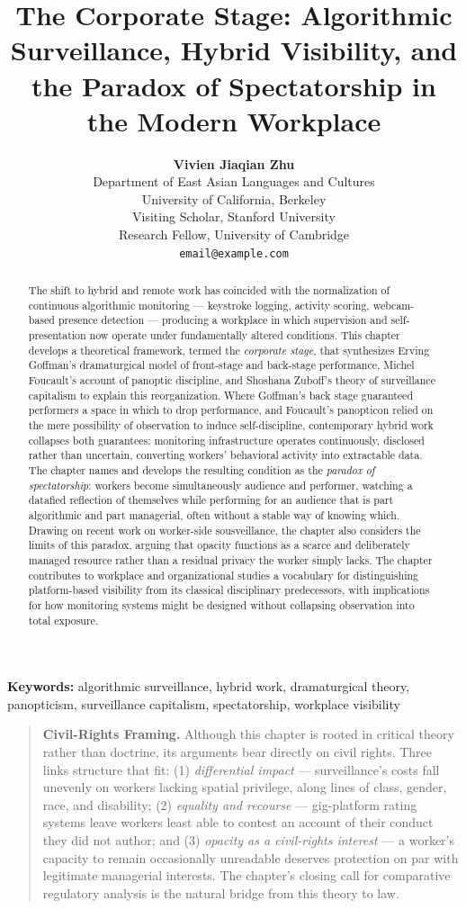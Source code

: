 \documentclass[12pt, a4paper]{article}
\title{\Large \textbf{The Corporate Stage: Algorithmic Surveillance, Hybrid Visibility, and the Paradox of Spectatorship in the Modern Workplace}}
\author{\textbf{Vivien Jiaqian Zhu} \\
Department of East Asian Languages and Cultures \\
University of California, Berkeley \\
Visiting Scholar, Stanford University \\
Research Fellow, University of Cambridge \\
\texttt{email@example.com}}
\date{}
\begin{document}
\maketitle

\begin{abstract}
\noindent The shift to hybrid and remote work has coincided with the normalization of continuous algorithmic monitoring --- keystroke logging, activity scoring, webcam-based presence detection --- producing a workplace in which supervision and self-presentation now operate under fundamentally altered conditions. This chapter develops a theoretical framework, termed the \textit{corporate stage}, that synthesizes Erving Goffman's dramaturgical model of front-stage and back-stage performance, Michel Foucault's account of panoptic discipline, and Shoshana Zuboff's theory of surveillance capitalism to explain this reorganization. Where Goffman's back stage guaranteed performers a space in which to drop performance, and Foucault's panopticon relied on the mere possibility of observation to induce self-discipline, contemporary hybrid work collapses both guarantees: monitoring infrastructure operates continuously, disclosed rather than uncertain, converting workers' behavioral activity into extractable data. The chapter names and develops the resulting condition as the \textit{paradox of spectatorship}: workers become simultaneously audience and performer, watching a datafied reflection of themselves while performing for an audience that is part algorithmic and part managerial, often without a stable way of knowing which. Drawing on recent work on worker-side sousveillance, the chapter also considers the limits of this paradox, arguing that opacity functions as a scarce and deliberately managed resource rather than a residual privacy the worker simply lacks. The chapter contributes to workplace and organizational studies a vocabulary for distinguishing platform-based visibility from its classical disciplinary predecessors, with implications for how monitoring systems might be designed without collapsing observation into total exposure.
\end{abstract}

\noindent\textbf{Keywords:} algorithmic surveillance, hybrid work, dramaturgical theory, panopticism, surveillance capitalism, spectatorship, workplace visibility

\begin{quote}
\textbf{Civil-Rights Framing.} Although this chapter is rooted in critical theory rather than doctrine, its arguments bear directly on civil rights. Three links structure that fit: (1) \textit{differential impact} --- surveillance's costs fall unevenly on workers lacking spatial privilege, along lines of class, gender, race, and disability; (2) \textit{equality and recourse} --- gig-platform rating systems leave workers least able to contest an account of their conduct they did not author; and (3) \textit{opacity as a civil-rights interest} --- a worker's capacity to remain occasionally unreadable deserves protection on par with legitimate managerial interests. The chapter's closing call for comparative regulatory analysis is the natural bridge from this theory to law.
\end{quote}
\end{document}
